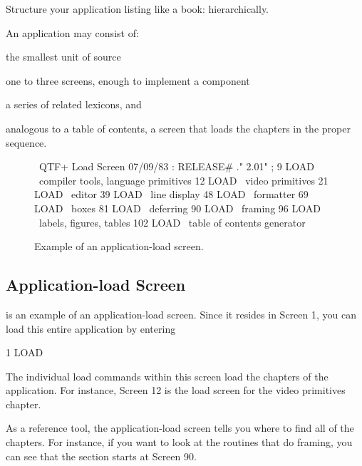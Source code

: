 \begin{tip}
Structure your application listing like a book: hierarchically.
\end{tip}
An application may consist of:

\begin{description}\parsep=0pt\itemsep=0pt
\item[Screens:] the smallest unit of \Forth{} source
\item[Lexicons:] one to three screens, enough to
implement a component
\item[Chapters:] a series of related lexicons, and
\item[Load screens:] analogous to a table of contents, a screen that
loads the chapters in the proper sequence.
\end{description}


\begin{figure*}[tttt]
\caption{Example of an application-load screen.}
\setcounter{screen}{1}
\begin{Screen}
\ QTF+ Load Screen                                      07/09/83
: RELEASE#   ." 2.01" ;
  9 LOAD  \ compiler tools, language primitives
 12 LOAD  \ video primitives
 21 LOAD  \ editor
 39 LOAD  \ line display
 48 LOAD  \ formatter
 69 LOAD  \ boxes
 81 LOAD  \ deferring
 90 LOAD  \ framing
 96 LOAD  \ labels, figures, tables
102 LOAD  \ table of contents generator




\end{Screen}
\end{figure*}%

\subsection{Application-load Screen}%

 is an example of an application-load screen.  Since it
resides in Screen 1, you can load this entire application by entering
\begin{Code}
1 LOAD
\end{Code}
The individual load commands within this screen load the chapters of
the application.  For instance, Screen 12 is the load screen for the
video primitives chapter.

As a reference tool, the application-load screen tells you where to
find all of the chapters.  For instance, if you want to look at the
routines that do framing, you can see that the section starts at
Screen 90.

